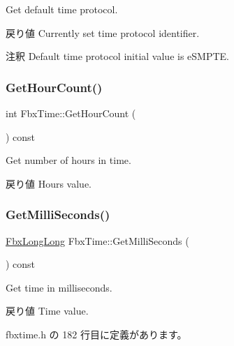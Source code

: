 Get default time protocol. \begin{DoxyReturn}{戻り値}
Currently set time protocol identifier. 
\end{DoxyReturn}
\begin{DoxyRemark}{注釈}
Default time protocol initial value is e\+S\+M\+P\+TE. 
\end{DoxyRemark}
\mbox{\label{class_fbx_time_acd535f01e345e54e3f3bb0c12c482d37}} 
\subsubsection{\texorpdfstring{Get\+Hour\+Count()}{GetHourCount()}}
{\footnotesize\ttfamily int Fbx\+Time\+::\+Get\+Hour\+Count (\begin{DoxyParamCaption}{ }\end{DoxyParamCaption}) const}

Get number of hours in time. \begin{DoxyReturn}{戻り値}
Hours value. 
\end{DoxyReturn}
\mbox{\label{class_fbx_time_a221649a9e998cd387df4116068322553}} 
\subsubsection{\texorpdfstring{Get\+Milli\+Seconds()}{GetMilliSeconds()}}
{\footnotesize\ttfamily \hyperlink{fbxtypes_8h_ac34da60c22b0a7e1156e5480da7d71f1}{Fbx\+Long\+Long} Fbx\+Time\+::\+Get\+Milli\+Seconds (\begin{DoxyParamCaption}{ }\end{DoxyParamCaption}) const\hspace{0.3cm}{\ttfamily [inline]}}

Get time in milliseconds. \begin{DoxyReturn}{戻り値}
Time value. 
\end{DoxyReturn}


 fbxtime.\+h の 182 行目に定義があります。

\mbox{\label{class_fbx_time_aa8c9ef48cd8d43e83e1c3bb42d62ca95}} 
